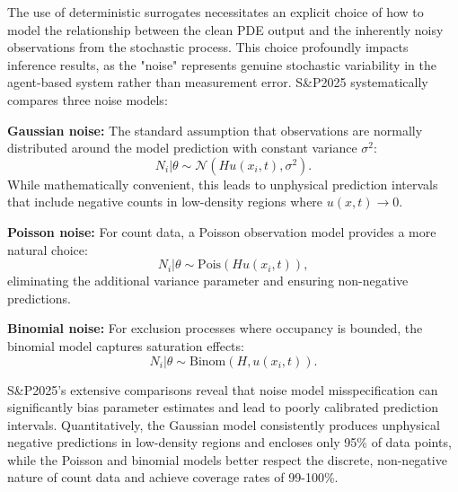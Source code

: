 \documentclass{article}
\begin{document}
The use of deterministic surrogates necessitates an explicit choice of how to model the relationship between the clean PDE output and the inherently noisy observations from the stochastic process. This choice profoundly impacts inference results, as the "noise" represents genuine stochastic variability in the agent-based system rather than measurement error. S\&P2025 systematically compares three noise models:

\textbf{Gaussian noise:} The standard assumption that observations are normally distributed around the model prediction with constant variance $\sigma^2$:
\begin{equation}
	N_i | \theta \sim \mathcal{N}(Hu(x_i, t), \sigma^2).
\end{equation}
While mathematically convenient, this leads to unphysical prediction intervals that include negative counts in low-density regions where $u(x,t) \to 0$.

\textbf{Poisson noise:} For count data, a Poisson observation model provides a more natural choice:
\begin{equation}
	N_i | \theta \sim \text{Pois}(Hu(x_i, t)),
\end{equation}
eliminating the additional variance parameter and ensuring non-negative predictions.

\textbf{Binomial noise:} For exclusion processes where occupancy is bounded, the binomial model captures saturation effects:
\begin{equation}
	N_i | \theta \sim \text{Binom}(H, u(x_i, t)).
\end{equation}

S\&P2025's extensive comparisons reveal that noise model misspecification can significantly bias parameter estimates and lead to poorly calibrated prediction intervals. Quantitatively, the Gaussian model consistently produces unphysical negative predictions in low-density regions and encloses only 95\% of data points, while the Poisson and binomial models better respect the discrete, non-negative nature of count data and achieve coverage rates of 99-100\%.
\end{document}
